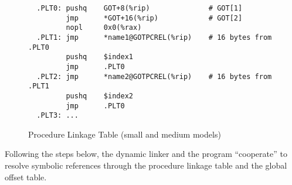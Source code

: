 \begin{figure}[H]
\Hrule
\caption{Procedure Linkage Table (small and medium models)}
\label{small_med_plt}
\begin{footnotesize}
\begin{verbatim}
  .PLT0: pushq    GOT+8(%rip)              # GOT[1]
         jmp      *GOT+16(%rip)            # GOT[2]
         nopl     0x0(%rax)
  .PLT1: jmp      *name1@GOTPCREL(%rip)    # 16 bytes from .PLT0
         pushq    $index1
         jmp      .PLT0
  .PLT2: jmp      *name2@GOTPCREL(%rip)    # 16 bytes from .PLT1
         pushq    $index2
         jmp      .PLT0
  .PLT3: ...
\end{verbatim}%
\end{footnotesize}
\Hrule
\end{figure}

Following the steps below, the dynamic linker and the program
``cooperate'' to resolve symbolic references through the procedure
linkage table and the global offset table.

